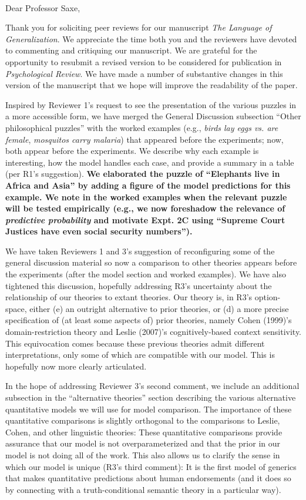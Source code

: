 \documentclass[11pt,letterpaper]{letter} %
\def\opening#1{\thispagestyle{empty}
{\centering\fromaddress \vspace{0.6in} \\ %
\hspace*{\longindentation}\hspace*{\fill}\par} %
\vspace{0.4in} %
\noindent #1 %
}
\begin{document}
\begin{letter}

\opening{Dear Professor Saxe,}

Thank you for soliciting peer reviews for our manuscript \emph{The Language of Generalization}. We appreciate the time both you and the reviewers have devoted to commenting and critiquing our manuscript. We are grateful for the opportunity to resubmit a revised version to be considered for publication in \emph{Psychological Review}.
We have made a number of substantive changes in this version of the manuscript that we hope will improve the readability of the paper.

Inspired by Reviewer 1's request to see the presentation of the various puzzles in a more accessible form,
we have merged the General Discussion subsection ``Other philosophical puzzles'' with the worked examples (e.g., \emph{birds lay eggs vs. are female}, \emph{mosquitos carry malaria}) that appeared before the experiments; now, both appear before the experiments.
We describe why each example is interesting, how the model handles each case, and provide a summary in a table (per R1's suggestion).
\textbf{We elaborated the puzzle of ``Elephants live in Africa and Asia'' by adding a figure of the model predictions for this example.
We note in the worked examples when the relevant puzzle will be tested empirically (e.g., we now foreshadow the relevance of \emph{predictive probability} and motivate Expt. 2C using ``Supreme Court Justices have even social security numbers'').}

We have taken Reviewers 1 and 3's suggestion of reconfiguring some of the general discussion material so now a comparison to other theories appears before the experiments (after the model section and worked examples).
We have also tightened this discussion, hopefully addressing R3's uncertainty about the relationship of our theories to extant theories. 
Our theory is, in R3's option-space, either (e) an outright alternative to prior theories, or (d) a more precise specification of (at least some aspects of) prior theories, namely Cohen (1999)'s domain-restriction theory and Leslie (2007)'s cognitively-based context sensitivity.
This equivocation comes because these previous theories admit different interpretations, only some of which are compatible with our model.
This is hopefully now more clearly articulated.

In the hope of addressing Reviewer 3's second comment, we include an additional subsection in the ``alternative theories'' section describing the various alternative quantitative models we will use for model comparison. 
The importance of these quantitative comparisons is slightly orthogonal to the comparisons to Leslie, Cohen, and other linguistic theories: These quantitative comparisons provide assurance that our model is not overparameterized and that the prior in our model is not doing all of the work. 
This also allows us to clarify the sense in which our model is unique (R3's third comment): It is the first model of generics that makes quantitative predictions about human endorsements (and it does so by connecting with a truth-conditional semantic theory in a particular way). 


\end{letter}
\end{document}
